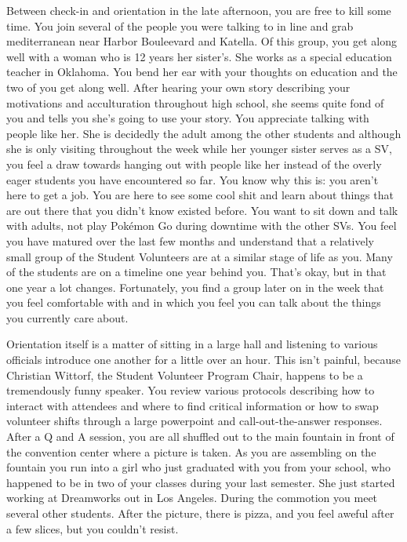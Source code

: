 \documentclass[../main.tex]{subfiles}
\begin{document}
Between check-in and orientation in the late afternoon, you are free to kill some time. You join several of the people you were talking to in line and grab mediterranean near Harbor Bouleevard and Katella. Of this group, you get along well with a woman who is 12 years her sister's. She works as a special education teacher in Oklahoma. You bend her ear with your thoughts on education and the two of you get along well. After hearing your own story describing your motivations and acculturation throughout high school, she seems quite fond of you and tells you she's going to use your story. You appreciate talking with people like her. She is decidedly the adult among the other students and although she is only visiting throughout the week while her younger sister serves as a SV, you feel a draw towards hanging out with people like her instead of the overly eager students you have encountered so far. You know why this is: you aren't here to get a job. You are here to see some cool shit and learn about things that are out there that you didn't know existed before. You want to sit down and talk with adults, not play Pokémon Go during downtime with the other SVs. You feel you have matured over the last few months and understand that a relatively small group of the Student Volunteers are at a similar stage of life as you. Many of the students are on a timeline one year behind you. That's okay, but in that one year a lot changes. Fortunately, you find a group later on in the week that you feel comfortable with and in which you feel you can talk about the things you currently care about.

Orientation itself is a matter of sitting in a large hall and listening to various officials introduce one another for a little over an hour. This isn't painful, because Christian Wittorf, the Student Volunteer Program Chair, happens to be a tremendously funny speaker. You review various protocols describing how to interact with attendees and where to find critical information or how to swap volunteer shifts through a large powerpoint and call-out-the-answer responses. After a Q and A session, you are all shuffled out to the main fountain in front of the convention center where a picture is taken. As you are assembling on the fountain you run into a girl who just graduated with you from your school, who happened to be in two of your classes during your last semester. She just started working at Dreamworks out in Los Angeles. During the commotion you meet several other students. After the picture, there is pizza, and you feel aweful after a few slices, but you couldn't resist.
\end{document}
